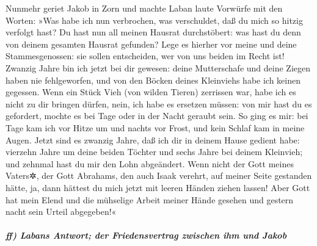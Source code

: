  Nunmehr geriet Jakob in Zorn und machte Laban laute
Vorwürfe mit den Worten: »Was habe ich nun verbrochen, was verschuldet,
daß du mich so hitzig verfolgt hast?  Du hast nun all
meinen Hausrat durchstöbert: was hast du denn von deinem gesamten
Hausrat gefunden? Lege es hierher vor meine und deine Stammesgenossen:
sie sollen entscheiden, wer von uns beiden im Recht ist! 
Zwanzig Jahre bin ich jetzt bei dir gewesen: deine Mutterschafe und
deine Ziegen haben nie fehlgeworfen, und von den Böcken deines
Kleinviehs habe ich keinen gegessen.  Wenn ein Stück Vieh
(von wilden Tieren) zerrissen war, habe ich es nicht zu dir bringen
dürfen, nein, ich habe es ersetzen müssen: von mir hast du es gefordert,
mochte es bei Tage oder in der Nacht geraubt sein.  So
ging es mir: bei Tage kam ich vor Hitze um und nachts vor Frost, und
kein Schlaf kam in meine Augen.  Jetzt sind es zwanzig
Jahre, daß ich dir in deinem Hause gedient habe: vierzehn Jahre um deine
beiden Töchter und sechs Jahre bei deinem Kleinvieh; und zehnmal hast du
mir den Lohn abgeändert.  Wenn nicht der Gott meines
Vaters✲, der Gott Abrahams, den auch Isaak verehrt, auf meiner Seite
gestanden hätte, ja, dann hättest du mich jetzt mit leeren Händen ziehen
lassen! Aber Gott hat mein Elend und die mühselige Arbeit meiner Hände
gesehen und gestern nacht sein Urteil abgegeben!«

\hypertarget{ff-labans-antwort-der-friedensvertrag-zwischen-ihm-und-jakob}{%
\subparagraph{ff) Labans Antwort; der Friedensvertrag zwischen ihm und
Jakob}\label{ff-labans-antwort-der-friedensvertrag-zwischen-ihm-und-jakob}}

